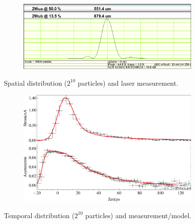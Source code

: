 \begin{center}
\begin{figure}[H]
   \begin{subfigure}{0.4\textwidth}
      
   \end{subfigure}
   \qquad \qquad \qquad
   \begin{subfigure}{0.5\textwidth}
      \includegraphics[width=\textwidth]{fig/laser}
   \end{subfigure}
   \caption{Spatial distribution ($2^{10}$ particles) and laser measurement.}
   \label{fig:gen_sp}
\end{figure}
\end{center}

\begin{center}
\begin{figure}[H]
   \begin{subfigure}{0.4\textwidth}
      
   \end{subfigure}
   \qquad \qquad \qquad
   \begin{subfigure}{0.5\textwidth}
      \includegraphics[width=\textwidth]{fig/bunch}
   \end{subfigure}
   \caption{Temporal distribution ($2^{10}$ particles) and measurement/model.}
   \label{fig:gen_tmp}
\end{figure}
\end{center}

